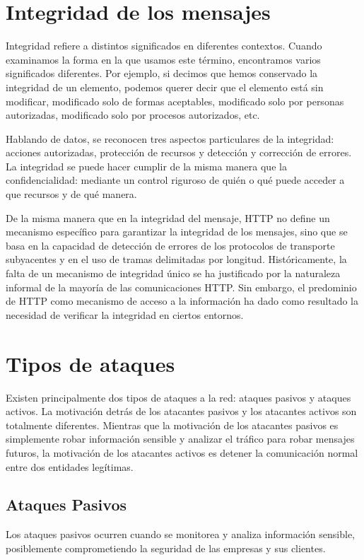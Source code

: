 \section{Integridad de los mensajes}
Integridad refiere a distintos significados en diferentes contextos. Cuando examinamos 
la forma en la que usamos este término, encontramos varios significados diferentes. 
Por ejemplo, si decimos que hemos conservado la integridad de un elemento, podemos 
querer decir que el elemento está sin modificar, modificado solo de formas aceptables, 
modificado solo por personas autorizadas, modificado solo por procesos autorizados, 
etc.

Hablando de datos, se reconocen tres aspectos particulares de la integridad: 
acciones autorizadas, protección de recursos y detección y corrección de errores. 
La integridad se puede hacer cumplir de la misma manera que la confidencialidad: 
mediante un control riguroso de quién o qué puede acceder a que recursos y de qué 
manera.

De la misma manera que en la integridad del mensaje,
HTTP no define un mecanismo específico para garantizar la integridad de los 
mensajes, sino que se basa en la capacidad de detección de errores de los 
protocolos de transporte subyacentes y en el uso de tramas delimitadas por 
longitud. Históricamente, la falta de un mecanismo de integridad único se 
ha justificado por la naturaleza informal de la mayoría de las comunicaciones 
HTTP. Sin embargo, el predominio de HTTP como mecanismo de acceso a la 
información ha dado como resultado la necesidad de verificar la integridad
en ciertos entornos.


\section{Tipos de ataques}
Existen principalmente dos tipos de ataques a la red: ataques pasivos y 
ataques activos. La motivación detrás de los atacantes pasivos y los atacantes 
activos son totalmente diferentes. Mientras que la motivación de los atacantes 
pasivos es simplemente robar información sensible y analizar el tráfico para 
robar mensajes futuros, la motivación de los atacantes activos es detener la 
comunicación normal entre dos entidades legítimas.

\subsection{Ataques Pasivos}
Los ataques pasivos ocurren cuando se monitorea y analiza 
información sensible, posiblemente comprometiendo la seguridad de las 
empresas y sus clientes. 

